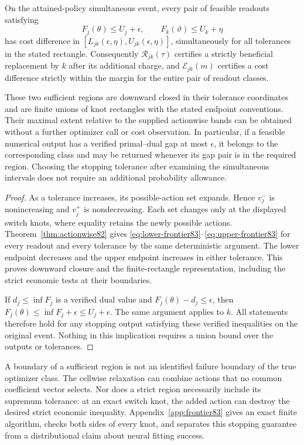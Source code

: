 \begin{theorem}\label{thm:frontier83}
On the attained-policy simultaneous event, every pair of feasible readouts satisfying
\[
 F_j(\theta)\le U_j+\epsilon,\qquad F_k(\vartheta)\le U_k+\eta
\]
has cost difference in $[L_{jk}(\epsilon,\eta),U_{jk}(\epsilon,\eta)]$, simultaneously for all tolerances in the stated rectangle. Consequently $\mathcal R_{jk}(\tau)$ certifies a strictly beneficial replacement by $k$ after its additional charge, and $\mathcal E_{jk}(m)$ certifies a cost difference strictly within the margin for the entire pair of readout classes.

These two sufficient regions are downward closed in their tolerance coordinates and are finite unions of knot rectangles with the stated endpoint conventions. Their maximal extent relative to the supplied actionwise bands can be obtained without a further optimizer call or cost observation. In particular, if a feasible numerical output has a verified primal--dual gap at most $\epsilon$, it belongs to the corresponding class and may be returned whenever its gap pair is in the required region. Choosing the stopping tolerance after examining the simultaneous intervals does not require an additional probability allowance.
\end{theorem}

\begin{proof}
As a tolerance increases, its possible-action set expands. Hence $v_j^-$ is nonincreasing and $v_j^+$ is nondecreasing. Each set changes only at the displayed switch knots, where equality retains the newly possible actions. Theorem~\ref{thm:actionwise82} gives \eqref{eq:lower-frontier83}--\eqref{eq:upper-frontier83} for every readout and every tolerance by the same deterministic argument. The lower endpoint decreases and the upper endpoint increases in either tolerance. This proves downward closure and the finite-rectangle representation, including the strict economic tests at their boundaries.

If $d_j\le\inf F_j$ is a verified dual value and $F_j(\theta)-d_j\le\epsilon$, then $F_j(\theta)\le\inf F_j+\epsilon\le U_j+\epsilon$. The same argument applies to $k$. All statements therefore hold for any stopping output satisfying these verified inequalities on the original event. Nothing in this implication requires a union bound over the outputs or tolerances.
\end{proof}

A boundary of a sufficient region is not an identified failure boundary of the true optimizer class. The cellwise relaxation can combine actions that no common coefficient vector selects. Nor does a strict region necessarily include its supremum tolerance: at an exact switch knot, the added action can destroy the desired strict economic inequality. Appendix~\ref{app:frontier83} gives an exact finite algorithm, checks both sides of every knot, and separates this stopping guarantee from a distributional claim about neural fitting success.
